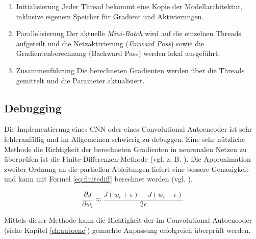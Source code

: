 \begin{enumerate}
\item Initialisierung \textemdash\space Jeder Thread bekommt eine Kopie der Modellarchitektur, inklusive eigenem Speicher für Gradient und Aktivierungen.

\item Parallelisierung \textemdash\space Der aktuelle \textit{Mini-Batch} wird auf die einzelnen Threads aufgeteilt und die Netzaktivierung (\textit{Forward Pass}) sowie die Gradientenberechnung (Backward Pass) werden lokal ausgeführt.

\item Zusammenführung \textemdash\space Die berechneten Gradienten werden über die Threads gemittelt und die Parameter aktualisiert.
\end{enumerate}


\subsection{Debugging}
\label{ch:debug}
Die Implementierung eines CNN oder eines Convolutional Autoencoder ist sehr fehleranfällig und im Allgemeinen schwierig zu debuggen. Eine sehr nützliche Methode die Richtigkeit der berechneten Gradienten in neuronalen Netzen zu überprüfen ist die Finite-Differenzen-Methode (vgl. z. B. \cite{Bouvrie2006}). Die Approximation zweiter Ordnung an die partiellen Ableitungen liefert eine bessere Genauigkeit und kann mit Formel \ref{eq:finitediff} berechnet werden (vgl. \cite{Bengio2012}).

\begin{equation}
\label{eq:finitediff} 
\frac{\partial J}{\partial w_i}  \approx \frac{J(w_i + \epsilon) - J(w_i - \epsilon)}{2 \epsilon}
\end{equation}

Mittels dieser Methode kann die Richtigkeit der im Convolutional Autoencoder (siehe Kapitel \ref{ch:autoenc}) gemachte Anpassung erfolgreich überprüft werden.
